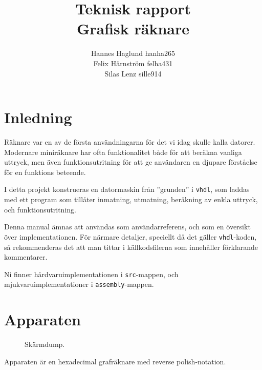 \documentclass[]{article}
\title{Teknisk rapport\\Grafisk räknare}
\author{Hannes Haglund hanha265\\Felix Härnström felha431\\Silas Lenz sille914}
\begin{document}
\maketitle

\newpage

{\small\tableofcontents}

\newpage

\section{Inledning}

Räknare var en av de första användningarna för det vi idag skulle kalla datorer. Modernare miniräknare har ofta funktionalitet både för att beräkna vanliga uttryck, men även funktionsutritning för att ge användaren en djupare förståelse för en funktions beteende.

I detta projekt konstrueras en datormaskin från ''grunden'' i \texttt{vhdl}, som laddas med ett program som tillåter inmatning, utmatning, beräkning av enkla uttryck, och funktionsutritning.

Denna manual ämnas att användas som användarreferens, och som en översikt över implementationen. För närmare detaljer, speciellt då det gäller \texttt{vhdl}-koden, så rekommenderas det att man tittar i källkodsfilerna som innehåller förklarande kommentarer.

Ni finner hårdvaruimplementationen i \texttt{src}-mappen, och mjukvaruimplementationer i \texttt{assembly}-mappen.

\newpage
\section{Apparaten}
\begin{figure}[h!]
	\caption{Skärmdump.}
\end{figure}
\noindent
Apparaten är en hexadecimal grafräknare med reverse polish-notation.
\end{document}
